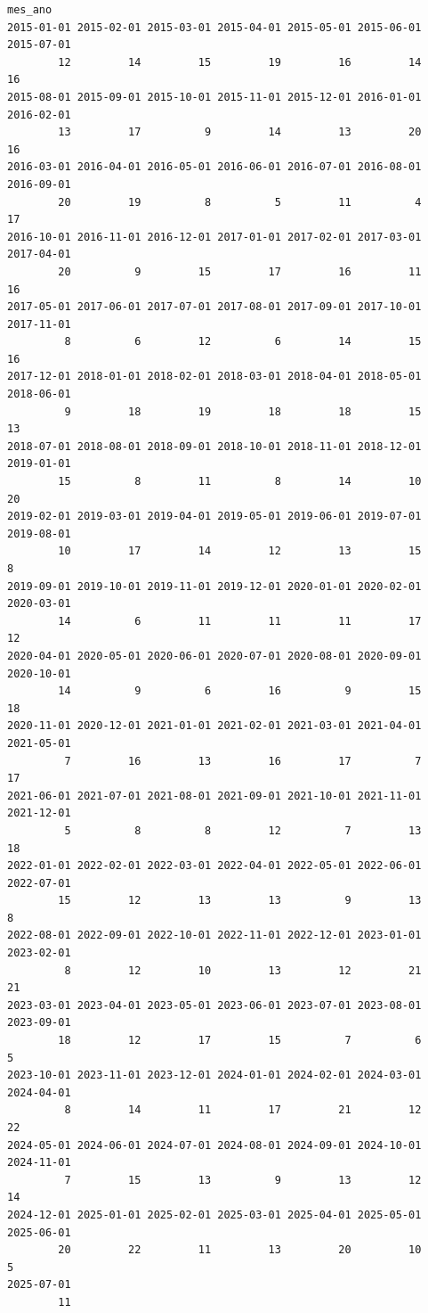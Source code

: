 \documentclass[
  letterpaper,
  DIV=11,
  numbers=noendperiod]{scrartcl}
\theoremstyle{definition}
\theoremstyle{definition}
\theoremstyle{plain}
\theoremstyle{plain}
\theoremstyle{remark}
\begin{document}
\begin{verbatim}
mes_ano
2015-01-01 2015-02-01 2015-03-01 2015-04-01 2015-05-01 2015-06-01 2015-07-01 
        12         14         15         19         16         14         16 
2015-08-01 2015-09-01 2015-10-01 2015-11-01 2015-12-01 2016-01-01 2016-02-01 
        13         17          9         14         13         20         16 
2016-03-01 2016-04-01 2016-05-01 2016-06-01 2016-07-01 2016-08-01 2016-09-01 
        20         19          8          5         11          4         17 
2016-10-01 2016-11-01 2016-12-01 2017-01-01 2017-02-01 2017-03-01 2017-04-01 
        20          9         15         17         16         11         16 
2017-05-01 2017-06-01 2017-07-01 2017-08-01 2017-09-01 2017-10-01 2017-11-01 
         8          6         12          6         14         15         16 
2017-12-01 2018-01-01 2018-02-01 2018-03-01 2018-04-01 2018-05-01 2018-06-01 
         9         18         19         18         18         15         13 
2018-07-01 2018-08-01 2018-09-01 2018-10-01 2018-11-01 2018-12-01 2019-01-01 
        15          8         11          8         14         10         20 
2019-02-01 2019-03-01 2019-04-01 2019-05-01 2019-06-01 2019-07-01 2019-08-01 
        10         17         14         12         13         15          8 
2019-09-01 2019-10-01 2019-11-01 2019-12-01 2020-01-01 2020-02-01 2020-03-01 
        14          6         11         11         11         17         12 
2020-04-01 2020-05-01 2020-06-01 2020-07-01 2020-08-01 2020-09-01 2020-10-01 
        14          9          6         16          9         15         18 
2020-11-01 2020-12-01 2021-01-01 2021-02-01 2021-03-01 2021-04-01 2021-05-01 
         7         16         13         16         17          7         17 
2021-06-01 2021-07-01 2021-08-01 2021-09-01 2021-10-01 2021-11-01 2021-12-01 
         5          8          8         12          7         13         18 
2022-01-01 2022-02-01 2022-03-01 2022-04-01 2022-05-01 2022-06-01 2022-07-01 
        15         12         13         13          9         13          8 
2022-08-01 2022-09-01 2022-10-01 2022-11-01 2022-12-01 2023-01-01 2023-02-01 
         8         12         10         13         12         21         21 
2023-03-01 2023-04-01 2023-05-01 2023-06-01 2023-07-01 2023-08-01 2023-09-01 
        18         12         17         15          7          6          5 
2023-10-01 2023-11-01 2023-12-01 2024-01-01 2024-02-01 2024-03-01 2024-04-01 
         8         14         11         17         21         12         22 
2024-05-01 2024-06-01 2024-07-01 2024-08-01 2024-09-01 2024-10-01 2024-11-01 
         7         15         13          9         13         12         14 
2024-12-01 2025-01-01 2025-02-01 2025-03-01 2025-04-01 2025-05-01 2025-06-01 
        20         22         11         13         20         10          5 
2025-07-01 
        11 
\end{verbatim}
\end{document}
